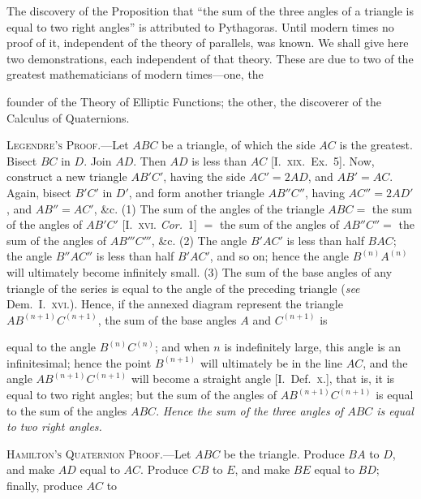 \documentclass[oneside]{book}
\newcommand{\ibksp}{\hspace{-1.5em}}
\newcommand\imgcent[2]{
\begin{center}

\end{center}
}
\begin{document}
\begin{footnotesize}
The discovery of the Proposition that ``the sum of the three
angles of a triangle is equal to two right angles'' is attributed to
Pythagoras. Until modern times no proof of it, independent of
the theory of parallels, was known. We shall give here two
demonstrations, each independent of that theory. These are due
to two of the greatest mathematicians of modern times---one, the

founder of the Theory of Elliptic Functions; the other, the discoverer
of the Calculus of Quaternions.


\imgcent{268}{f260}

\textsc{Legendre's Proof.}---Let $ABC$ be a triangle, of which the
side $AC$ is the greatest. Bisect $BC$ in $D$. Join $AD$. Then $AD$ is
less than $AC$ [I.~\textsc{xix.}\ Ex.~5]. Now, construct a new triangle
$AB'C'$, having the side $AC' = 2AD$, and $AB' = AC$. Again, bisect
$B'C'$ in $D'$, and form another triangle $AB''C''$, having $AC'' = 2AD'$,
and $AB'' = AC'$, \&c. (1) The sum of the angles of the triangle $ABC
=$ the sum of the angles of $AB'C'$ [I.~\textsc{xvi.} \emph{Cor.}~1] $=$ the sum of the
angles of $AB''C'' =$ the sum of the angles of $AB'''C'''$, \&c. (2) The
angle $B'AC'$ is less than half $BAC$; the angle $B''AC''$ is less than
half $B'AC'$, and so on; hence the angle $B^{(n)} A^{(n)}$ will ultimately
become infinitely small. (3) The sum of the base angles of any
triangle of the series is equal to the angle of the preceding triangle
(\emph{see} Dem.\ I.~\textsc{xvi.}). Hence, if the annexed diagram
represent the triangle $AB^{(n+1)}C^{(n+1)}$,
the sum of the base angles $A$ and $C^{(n+1)}$ is

\imgcent{278}{f261}
equal to the angle $B^{(n)}C^{(n)}$; and when $n$ is indefinitely large, this
angle is an infinitesimal; hence the point $B^{(n+1)}$ will ultimately be
in the line $AC$, and the angle $AB^{(n+1)}C^{(n+1)}$ will become a straight
angle [I.~Def.\ \textsc{x.}], that is, it is equal to two right angles; but the
sum of the angles of $AB^{(n+1)}C^{(n+1)}$ is equal to the sum of the
angles $ABC$. \emph{Hence the sum of the three angles of $ABC$ is equal
to two right angles.}


\imgcent{215}{f249}

\addcontentsline{toc}{section}{\ibksp\;,,\protect\phantom{.---}Hamilton's\protect\phantom{\ proof },,}
\textsc{Hamilton's Quaternion Proof.}---Let $ABC$ be the triangle.
Produce $BA$ to $D$, and make $AD$ equal to $AC$. Produce
$CB$ to $E$, and make $BE$ equal to $BD$; finally, produce $AC$ to


\end{footnotesize}
\end{document}
